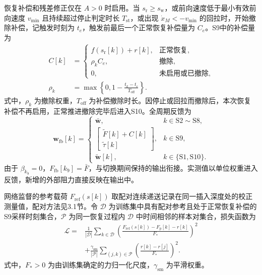 \documentclass{JQR_LaTeX_Template-0507/JQRnew}
\begin{document}
恢复补偿和残差修正仅在 $A>0$ 时启用。当 $s_{\mathrm r}\ge s_{\mathrm w}$，或前向速度低于最小有效前向速度 $v_{\min}$ 且持续超过停止判定时长 $T_{\mathrm{st}}$，或出现 $\dot x_M<-v_{\min}$ 的回拉时，开始撤除补偿，记触发时刻为 $t_e$，触发前最后一个正常恢复补偿量为 $C_e$。S9中的补偿量为
\begin{equation}
	\label{eq:withdrawal}
	\begin{aligned}
		C[k]&=\begin{cases}
			f(s_{\mathrm r}[k])+r[k],&\text{正常恢复},\\
			\rho_kC_e,&\text{撤除},\\
			0,&\text{未启用或已撤除},
		\end{cases}\\
		\rho_k&=\max\!\left\{0,1-\frac{t_k-t_e}{T_{\mathrm{off}}}\right\}.
	\end{aligned}
\end{equation}
式中，$\rho_k$ 为撤除权重，$T_{\mathrm{off}}$ 为补偿撤除时长。因停止或回拉而撤除后，本次恢复补偿不再启用，正常推进撤除完毕后进入S10。全周期反馈为
\begin{equation}
	\label{eq:phase-output}
	\bm w_{\mathrm{fb}}[k]=
	\begin{cases}
		\bar{\bm w},&k\in\mathrm{S2}\sim\mathrm{S8},\\
		\begin{bmatrix}\tilde F[k]+C[k]\\
			\tilde\tau[k]\end{bmatrix},&k\in\mathrm{S9},\\
		\tilde{\bm w}[k],&k\in\{\mathrm{S1},\mathrm{S10}\}.
	\end{cases}
\end{equation}
由于 $\beta_{k_9}=0$，$F_{\mathrm{fb}}[k_9]=\bar F$，与切换期间保持的输出衔接。实测值以单位权重进入反馈，新增的外部阻力直接反映在输出中。

网络监督的参考载荷 $F_{\mathrm{ref}}(s[k])$ 取配对连续递送记录在同一插入深度处的校正测量值，配对方法见3.1节。令 $\mathcal D$ 为训练集中具有配对参考且处于正常恢复补偿的S9采样时刻集合，$\mathcal P$ 为同一恢复过程内 $\mathcal D$ 中时间相邻的样本对集合，损失函数为
\begin{equation}
	\label{eq:gru-loss}
	\begin{aligned}
		\mathcal L={}&\frac{1}{|\mathcal D|}\sum_{k\in\mathcal D}
		\left(\frac{F_{\mathrm{ref}}(s[k])-F_{\mathrm p}[k]-r[k]}{F_*}\right)^2\\
		&+\frac{\gamma_{\mathrm{sm}}}{|\mathcal P|}
		\sum_{(j,k)\in\mathcal P}
		\left(\frac{r[k]-r[j]}{F_*}\right)^2.
	\end{aligned}
\end{equation}
式中，$F_*>0$ 为由训练集确定的力归一化尺度，$\gamma_{\mathrm{sm}}$ 为平滑权重。
\end{document}
